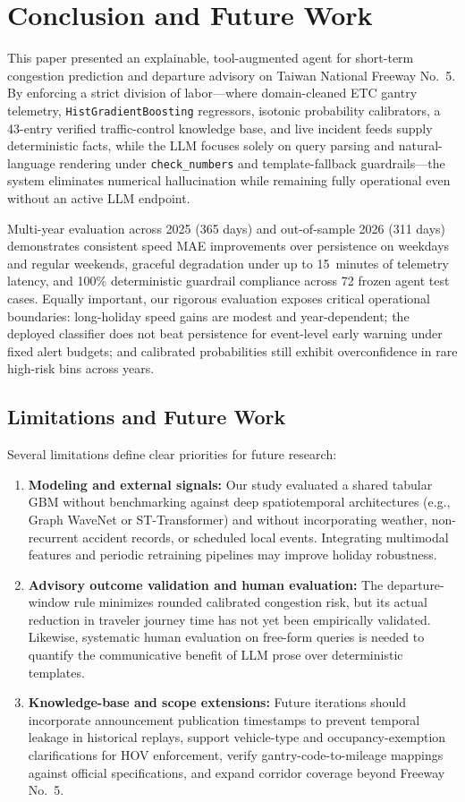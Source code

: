 \section{Conclusion and Future Work}\label{sec:conclusion}

This paper presented an explainable, tool-augmented agent for short-term congestion prediction and departure advisory on Taiwan National Freeway No.~5. By enforcing a strict division of labor---where domain-cleaned ETC gantry telemetry, \texttt{HistGradientBoosting} regressors, isotonic probability calibrators, a 43-entry verified traffic-control knowledge base, and live incident feeds supply deterministic facts, while the LLM focuses solely on query parsing and natural-language rendering under \texttt{check\_numbers} and template-fallback guardrails---the system eliminates numerical hallucination while remaining fully operational even without an active LLM endpoint.

Multi-year evaluation across 2025 (365 days) and out-of-sample 2026 (311 days) demonstrates consistent speed MAE improvements over persistence on weekdays and regular weekends, graceful degradation under up to 15~minutes of telemetry latency, and 100\% deterministic guardrail compliance across 72 frozen agent test cases. Equally important, our rigorous evaluation exposes critical operational boundaries: long-holiday speed gains are modest and year-dependent; the deployed classifier does not beat persistence for event-level early warning under fixed alert budgets; and calibrated probabilities still exhibit overconfidence in rare high-risk bins across years.

\subsection{Limitations and Future Work}
Several limitations define clear priorities for future research:
\begin{enumerate}
    \item \textbf{Modeling and external signals:} Our study evaluated a shared tabular GBM without benchmarking against deep spatiotemporal architectures (e.g., Graph WaveNet or ST-Transformer) and without incorporating weather, non-recurrent accident records, or scheduled local events. Integrating multimodal features and periodic retraining pipelines may improve holiday robustness.
    \item \textbf{Advisory outcome validation and human evaluation:} The departure-window rule minimizes rounded calibrated congestion risk, but its actual reduction in traveler journey time has not yet been empirically validated. Likewise, systematic human evaluation on free-form queries is needed to quantify the communicative benefit of LLM prose over deterministic templates.
    \item \textbf{Knowledge-base and scope extensions:} Future iterations should incorporate announcement publication timestamps to prevent temporal leakage in historical replays, support vehicle-type and occupancy-exemption clarifications for HOV enforcement, verify gantry-code-to-mileage mappings against official specifications, and expand corridor coverage beyond Freeway No.~5.
\end{enumerate}
